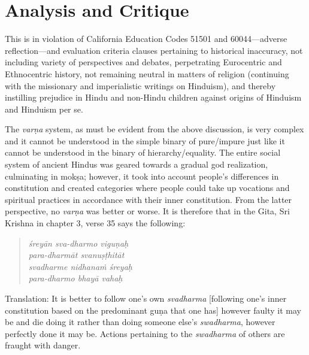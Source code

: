 \section*{Analysis and Critique} 

This is in violation of California Education Codes 51501 and 60044—adverse reflection—and evaluation criteria clauses pertaining to historical inaccuracy, not including variety of perspectives and debates, perpetrating Eurocentric and Ethnocentric history, not remaining neutral in matters of religion (continuing with the missionary and imperialistic writings on Hinduism), and thereby instilling prejudice in Hindu and non-Hindu children against origins of Hinduism and Hinduism per se.

The \textit{varṇa} system, as must be evident from the above discussion, is very complex and it cannot be understood in the simple binary of pure/impure just like it cannot be understood in the binary of hierarchy/equality. The entire social system of ancient Hindus was geared towards a gradual god realization, culminating in mokṣa; however, it took into account people’s differences in constitution and created categories where people could take up vocations and spiritual practices in accordance with their inner constitution. From the latter perspective, no \textit{varṇa} was better or worse. It is therefore that in the Gita, Sri Krishna in chapter 3, verse 35 says the following: 

\begin{quote}
\textit{śreyān sva-dharmo viguṇaḥ}\\
\textit{para-dharmāt svanuṣṭhitāt}\\
\textit{svadharme nidhanaṁ śreyaḥ}\\
\textit{para-dharmo bhayā vahaḥ}
\end{quote}
Translation: It is better to follow one’s own \textit{svadharma}  [following one’s inner constitution based on the predominant guṇa that one has] however faulty it may be and die doing it rather than doing someone else’s \textit{swadharma}, however perfectly done it may be. Actions pertaining to the \textit{swadharma} of others are fraught with danger. 

